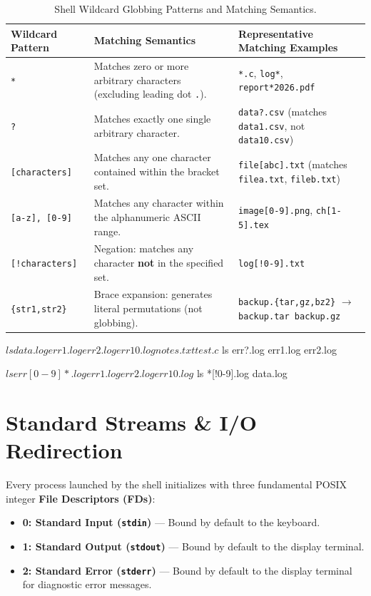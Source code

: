 \begin{table}[htbp]
\centering
\small
\begin{tabularx}{\linewidth}{l X l}
\toprule
\textbf{Wildcard Pattern} & \textbf{Matching Semantics} & \textbf{Representative Matching Examples} \\
\midrule
\texttt{*} & Matches zero or more arbitrary characters (excluding leading dot \texttt{.}). & \texttt{*.c}, \texttt{log*}, \texttt{report*2026.pdf} \\
\texttt{?} & Matches exactly one single arbitrary character. & \texttt{data?.csv} (matches \texttt{data1.csv}, not \texttt{data10.csv}) \\
\texttt{[characters]} & Matches any one character contained within the bracket set. & \texttt{file[abc].txt} (matches \texttt{filea.txt}, \texttt{fileb.txt}) \\
\texttt{[a-z], [0-9]} & Matches any character within the alphanumeric ASCII range. & \texttt{image[0-9].png}, \texttt{ch[1-5].tex} \\
\texttt{[!characters]} & Negation: matches any character \textbf{not} in the specified set. & \texttt{log[!0-9].txt} \\
\texttt{\{str1,str2\}} & Brace expansion: generates literal permutations (not globbing). & \texttt{backup.\{tar,gz,bz2\}} $\to$ \texttt{backup.tar backup.gz} \\
\bottomrule
\end{tabularx}
\caption{Shell Wildcard Globbing Patterns and Matching Semantics.}
\label{tab:globbing}
\end{table}

\begin{terminalbox}
$ ls
data.log  err1.log  err2.log  err10.log  notes.txt  test.c

$ ls err?.log
err1.log  err2.log

$ ls err[0-9]*.log
err1.log  err2.log  err10.log

$ ls *[!0-9].log
data.log
\end{terminalbox}

\section{Standard Streams \& I/O Redirection}
Every process launched by the shell initializes with three fundamental POSIX integer \textbf{File Descriptors (FDs)}:
\begin{itemize}[leftmargin=1.5em]
    \item \textbf{0: Standard Input (\texttt{stdin})} --- Bound by default to the keyboard.
    \item \textbf{1: Standard Output (\texttt{stdout})} --- Bound by default to the display terminal.
    \item \textbf{2: Standard Error (\texttt{stderr})} --- Bound by default to the display terminal for diagnostic error messages.
\end{itemize}

